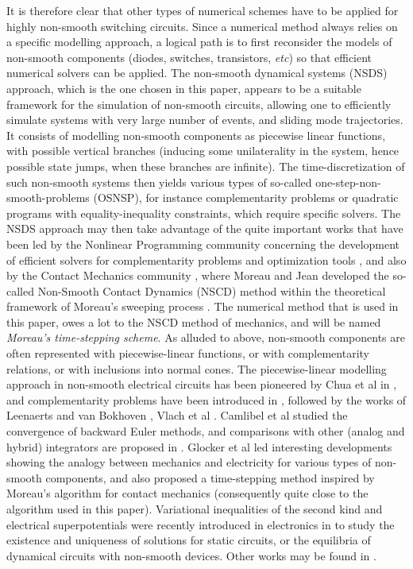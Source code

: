 \documentclass{article}
\begin{document}
It is therefore clear that other types of numerical schemes have to be applied for highly non-smooth switching circuits. Since a numerical method always relies on a specific modelling approach, a logical path is to first reconsider the models of non-smooth components (diodes, switches, transistors, {\em etc}) so that efficient numerical solvers can be applied. The non-smooth dynamical systems (NSDS) approach, which is the one chosen in this paper, appears to be a suitable framework for the simulation of non-smooth circuits, allowing one to efficiently simulate systems with very large number of events, and sliding mode trajectories. It consists of modelling non-smooth components as piecewise linear functions, with possible vertical branches (inducing some unilaterality in the system, hence possible state jumps, when these branches are infinite). The time-discretization of such non-smooth systems then yields various types of so-called one-step-non-smooth-problems (OSNSP), for instance complementarity problems or quadratic programs with equality-inequality constraints, which require specific solvers. The NSDS approach may then take advantage of the quite important works that have been led by the Nonlinear Programming community concerning the development of efficient solvers for complementarity problems \cite{facchinei} and optimization tools \cite{hiriart1992}, and also by the Contact Mechanics community \cite{acary-brogliato2008}, where Moreau and Jean developed the so-called Non-Smooth Contact Dynamics (NSCD) method within the theoretical framework of Moreau's sweeping process \cite{moreau1988,jean1999,moreau1999}. The numerical method that is used in this paper, owes a lot to the NSCD method of mechanics, and will be named {\em Moreau's time-stepping scheme}. As alluded to above, non-smooth components are often represented with piecewise-linear functions, or with complementarity relations, or with inclusions into normal cones. The piecewise-linear modelling approach in non-smooth electrical circuits has been pioneered by Chua et al  in \cite{chua1978,chua1983,chua1985}, and complementarity problems have been introduced in \cite{bokhoven1978,stevens1981,vandenberghe1989}, followed by the works of Leenaerts and van Bokhoven \cite{leenaerts1999,leenaerts-bokhoven1998}, Vlach et al \cite{bedrosian1992,vlach1997,vlach1995a,vlach1995b}. Camlibel et al \cite{frasca2008,camlibel2002} studied the convergence of backward Euler methods, and comparisons with other (analog and hybrid) integrators are proposed in \cite{vasca2009}. Glocker et al \cite{glocker2005,moller2007} led interesting developments showing the analogy between mechanics and electricity for various types of non-smooth components, and also proposed a time-stepping method inspired by Moreau's algorithm for contact mechanics (consequently quite close to the algorithm used in this paper). Variational inequalities of the second kind and electrical superpotentials  were recently introduced in electronics in \cite{adly2007,goelevenJOTA,addi2009} to study the existence and uniqueness of solutions for static circuits, or the equilibria of dynamical circuits with non-smooth devices. Other works may be found in \cite{enge2005,batlle2005,giaouris2008}.
\end{document}
